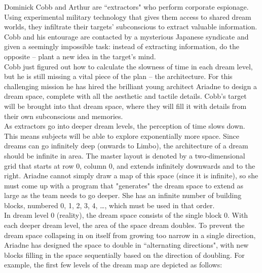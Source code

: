 
\noindent Dominick Cobb and Arthur are ``extractors" who perform corporate espionage. Using experimental military technology that gives them access to shared dream worlds, they infiltrate their targets' subconscious to extract valuable information. Cobb and his entourage are contacted by a mysterious Japanese syndicate and given a seemingly impossible task: instead of extracting information, do the opposite -- plant a new idea in the target's mind.\\

Cobb just figured out how to calculate the slowness of time in each dream level, but he is still missing a vital piece of the plan -- the architecture. For this challenging mission he has hired the brilliant young architect Ariadne to design a dream space, complete with all the aesthetic and tactile details. Cobb's target will be brought into that dream space, where they will fill it with details from their own subconscious and memories.\\

As extractors go into deeper dream levels, the perception of time slows down. This means subjects will be able to explore exponentially more space. Since dreams can go infinitely deep (onwards to Limbo), the architecture of a dream should be infinite in area. The master layout is denoted by a two-dimensional grid that starts at row 0, column 0, and extends infinitely downwards and to the right. Ariadne cannot simply draw a map of this space (since it is infinite), so she must come up with a program that "generates" the dream space to extend as large as the team needs to go deeper. She has an infinite number of building blocks, numbered 0, 1, 2, 3, 4, \dots, which must be used in that order.\\

In dream level 0 (reality), the dream space consists of the single block 0. With each deeper dream level, the area of the space dream doubles. To prevent the dream space collapsing in on itself from growing too narrow in a single direction, Ariadne has designed the space to double in ``alternating directions", with new blocks filling in the space sequentially based on the direction of doubling. For example, the first few levels of the dream map are depicted as follows:\\

